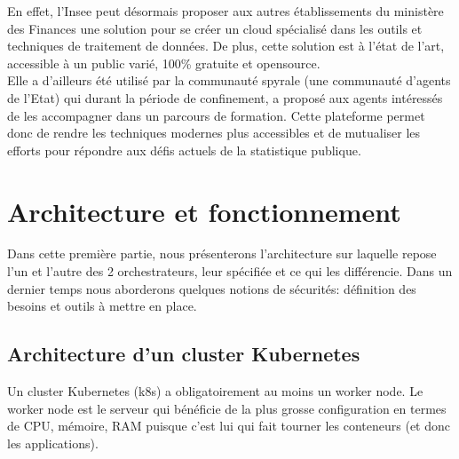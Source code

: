\documentclass[11pt,fleqn]{book} %
\begin{document}
En effet, l'Insee peut désormais proposer aux autres établissements du ministère des Finances une solution pour se créer un cloud spécialisé dans les outils et techniques de traitement de données. De plus, cette solution est à l’état de l’art, accessible à un public varié, 100\% gratuite et opensource.\\

Elle a d'ailleurs été utilisé par la communauté spyrale (une communauté d'agents de l'Etat) qui durant la période de confinement, a proposé aux agents intéressés de les accompagner dans un parcours de formation. Cette plateforme permet donc de rendre les techniques modernes plus accessibles et de mutualiser les efforts pour répondre aux défis actuels de la statistique publique.\\



\appendix


\chapter{Architecture et fonctionnement}
\vspace{-2cm}
\label{Architecture}

Dans cette première partie, nous présenterons l'architecture sur laquelle repose l'un et l'autre des 2 orchestrateurs, leur spécifiée et ce qui les différencie. Dans un dernier temps nous aborderons quelques notions de sécurités: définition des besoins et outils à mettre en place.



\section*{Architecture d'un cluster Kubernetes}
Un cluster Kubernetes (k8s) a obligatoirement au moins un worker node. Le worker node est le serveur qui bénéficie de la plus grosse configuration en termes de CPU, mémoire, RAM puisque c'est lui qui fait tourner les conteneurs (et donc les applications).\newline 
\end{document}
